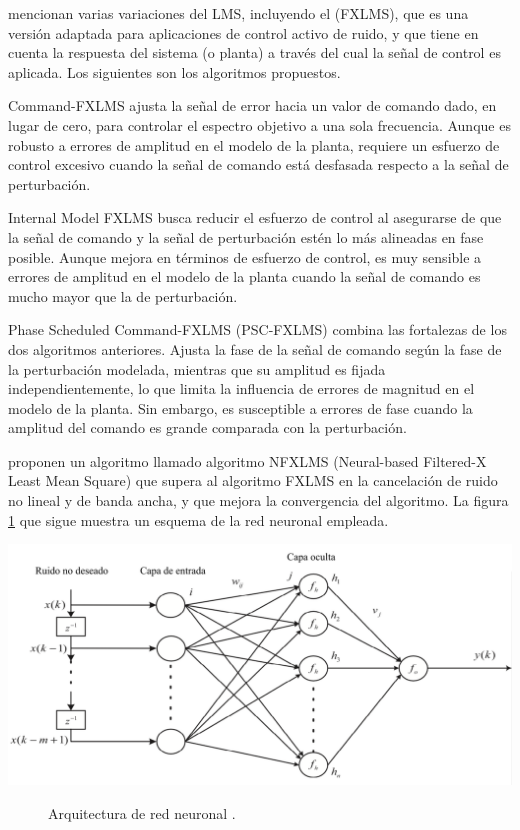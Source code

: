\documentclass[a4paper,12pt]{article}
\begin{document}
\textcite{Rees2006} mencionan varias variaciones del LMS, incluyendo el  (FXLMS), que es una versión adaptada para aplicaciones de control activo de ruido, y que tiene en cuenta la respuesta del sistema (o planta) a través del cual la señal de control es aplicada. Los siguientes son los algoritmos propuestos.

Command-FXLMS ajusta la señal de error hacia un valor de comando dado, en lugar de cero, para controlar el espectro objetivo a una sola frecuencia. Aunque es robusto a errores de amplitud en el modelo de la planta, requiere un esfuerzo de control excesivo cuando la señal de comando está desfasada respecto a la señal de perturbación.

Internal Model FXLMS busca reducir el esfuerzo de control al asegurarse de que la señal de comando y la señal de perturbación estén lo más alineadas en fase posible. Aunque mejora en términos de esfuerzo de control, es muy sensible a errores de amplitud en el modelo de la planta cuando la señal de comando es mucho mayor que la de perturbación.

Phase Scheduled Command-FXLMS (PSC-FXLMS) combina las fortalezas de los dos algoritmos anteriores. Ajusta la fase de la señal de comando según la fase de la perturbación modelada, mientras que su amplitud es fijada independientemente, lo que limita la influencia de errores de magnitud en el modelo de la planta. Sin embargo, es susceptible a errores de fase cuando la amplitud del comando es grande comparada con la perturbación.

\textcite{Chang2007} proponen un algoritmo llamado algoritmo NFXLMS (Neural-based Filtered-X Least Mean Square) que supera al algoritmo FXLMS en la cancelación de ruido no lineal y de banda ancha, y que mejora la convergencia del algoritmo.
La figura \ref{fig:Chang2007} que sigue muestra un esquema de la red neuronal empleada.

\begin{center}
    \includegraphics[width=\linewidth]{images/NFXLMS.png}
\end{center}
\vspace{\captionSpace}
\begin{figure}[H]
    \caption{Arquitectura de red neuronal \textcite[][3]{Chang2007}.}
    \label{fig:Chang2007}
\end{figure}
\end{document}
